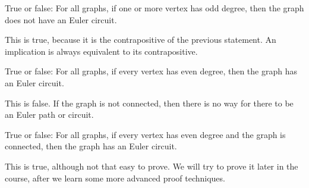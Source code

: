 \documentclass[11pt]{exam}
\begin{document}
\begin{questions}
\vfill

\question True or false: For all graphs, if one or more vertex has odd degree, then the graph does not have an Euler circuit.

\begin{solution}
  This is true, because it is the contrapositive of the previous statement.  An implication is always equivalent to its contrapositive.
\end{solution}

\vfill

\question True or false: For all graphs, if every vertex has even degree, then the graph has an Euler circuit.

\begin{solution}
  This is false.  If the graph is not connected, then there is no way for there to be an Euler path or circuit.
\end{solution}

\vfill

\question True or false: For all graphs, if every vertex has even degree and the graph is connected, then the graph has an Euler circuit.

\begin{solution}
  This is true, although not that easy to prove.  We will try to prove it later in the course, after we learn some more advanced proof techniques.
\end{solution}




\end{questions}
\end{document}
